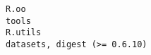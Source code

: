 \documentclass[
  letterpaper,
  DIV=11,
  numbers=noendperiod]{scrreprt}
\begin{document}
\begin{verbatim}
R.oo                                                                                                                                                                                                                                                                                                                                                                                                                                                                                                                                                                                                                                                                                                                                                                                                                                                                                                                                                                                                                                                                                                                                                                                                                                                                                                    tools
R.utils                                                                                                                                                                                                                                                                                                                                                                                                                                                                                                                                                                                                                                                                                                                                                                                                                                                                                                                                                                                                                                                                                                                                                                                                                                                                          datasets, digest (>= 0.6.10)

\end{verbatim}
\end{document}
